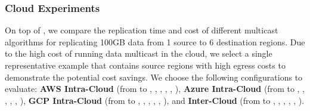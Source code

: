 \subsubsection{Cloud Experiments}
\label{ss:cloud-exp}
On top of \sys{}, we compare the replication time and cost of different multicast algorithms for replicating 100GB data from 1 source to 6 destination regions. Due to the high cost of running data multicast in the cloud, we select a single representative example that contains source regions with high egress costs to demonstrate the potential cost savings. We choose the following configurations to evaluate:  \textbf{AWS Intra-Cloud} (from  to , , , , , ), \textbf{Azure Intra-Cloud} (from  to , , , , , ), \textbf{GCP Intra-Cloud} (from  to , , , , , ), and \textbf{Inter-Cloud} (from  to , , , , , ).


